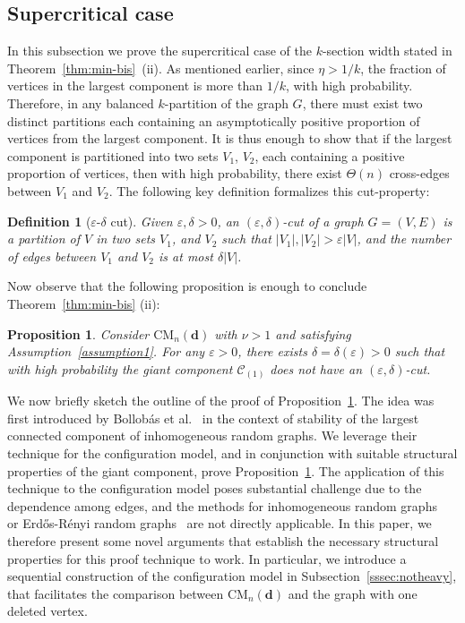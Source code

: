 \documentclass[11pt,a4paper, reqno]{article}
\numberwithin{equation}{section}
\numberwithin{equation}{section}
\def\sss{\scriptscriptstyle}
\newcommand{\1}{\ensuremath{\mathbbm{1}}}
\newcommand{\CM}{\ensuremath{\mathrm{CM}_n(\boldsymbol{d})}}
\newtheorem{proposition}[theorem]{Proposition}
\newtheorem{defn}{Definition}
\numberwithin{equation}{section}
\numberwithin{theorem}{section}
\begin{document}
\subsection{Supercritical case}
\label{ssec:ksection-supcrit}
In this subsection we prove the supercritical case of the $k$-section width stated in Theorem~\ref{thm:min-bis}~(ii).
As mentioned earlier, since $\eta>1/k$, the fraction of vertices in the largest component is more than $1/k$, with high probability.
Therefore, in any balanced $k$-partition of the graph $G$, there must exist two distinct partitions each containing an asymptotically positive proportion of vertices from the largest component.
It is thus enough to show that if the largest component is partitioned into two sets $V_1$, $V_2$, each containing a positive proportion of vertices, then  with high probability, there exist $\Theta(n)$ cross-edges between $V_1$ and $V_2$.
 The following key definition formalizes this cut-property:
\begin{defn}[$\varepsilon$-$\delta$ cut]\normalfont Given $\varepsilon, \delta>0$, an $(\varepsilon, \delta)$-cut of a graph $G=(V,E)$ is a partition of $V$ in two sets $V_1$, and $V_2$ such that $|V_1|,|V_2|> \varepsilon|V|$, and the number of edges between $V_1$ and $V_2$ is at most $\delta|V|$.
\end{defn} 
Now observe that the following proposition is enough to conclude Theorem~\ref{thm:min-bis} (ii):
\begin{proposition}\label{prop-no-e-d-cut} 
Consider $\CM$ with $\nu >1$ and satisfying {\rm Assumption~\ref{assumption1}}. For any $\varepsilon > 0$, there exists $\delta= \delta(\varepsilon) >0$ such that with high probability the giant component $\mathscr{C}_{\sss (1)}$ does not have an $(\varepsilon,\delta)$-cut. 
\end{proposition}

We now briefly sketch the outline of the  proof of Proposition~\ref{prop-no-e-d-cut}.
The idea was first introduced by Bollob\'as et al.~\cite{BJR07} in the context of stability of the largest connected component of inhomogeneous random graphs.
We leverage their technique for the configuration model, and in conjunction with suitable structural properties of the giant component, prove Proposition~\ref{prop-no-e-d-cut}.
The application of this technique to the configuration model poses substantial challenge due to the dependence among edges, and the methods for inhomogeneous random graphs~\cite{BJR07} or Erd\H{o}s-R\'enyi random graphs~\cite{LM01} are not directly applicable.
In this paper, we therefore present some novel arguments 
that establish the necessary structural properties for this proof technique to work.
In particular, we introduce a sequential construction
of the configuration model in Subsection~\ref{sssec:notheavy}, 
that facilitates the comparison between $\CM$ and the graph with one deleted vertex.
\end{document}
